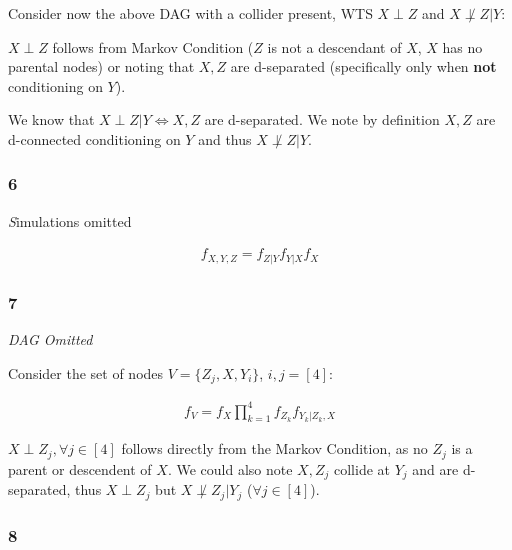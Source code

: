 \documentclass[11pt]{article}
\begin{document}
Consider now the above DAG with a collider present, WTS $X \perp Z$ and $X \not\perp Z | Y$:  \newline  
  
$X\perp Z$ follows from Markov Condition ($Z$ is not a descendant of $X$, $X$ has no parental nodes) or noting that $X,Z$ are d-separated (specifically only when \textbf{not} conditioning on $Y$). \newline 

We know that $X \perp Z | Y \Leftrightarrow X, Z$ are d-separated. We note by definition $X,Z$ are d-connected conditioning on $Y$ and thus $X \not\perp Z | Y$. 

\subsubsection*{6}

{\textit Simulations omitted}

\begin{gather*}
    f_{X,Y,Z}
    =
    f_{Z|Y}f_{Y|X}f_X
\end{gather*}

\subsubsection*{7}

{\it DAG Omitted}

Consider the set of nodes $V = \{Z_j, X, Y_i\}$, $i,j=[4]$: 

\begin{gather*}
    f_{V}
    =
    f_X
    \prod_{k=1}^4
    f_{Z_k}f_{Y_k | Z_k, X}
\end{gather*}

$X \perp Z_j, \forall j \in [4]$ follows directly from the Markov Condition, as no $Z_j$ is a parent or descendent of $X$. We could also note $X, Z_j$ collide at $Y_j$ and are d-separated, thus $X\perp Z_j$ but $X \not\perp Z_j | Y_j$ ($\forall j \in [4]$). 


\subsubsection*{8}
\end{document}
